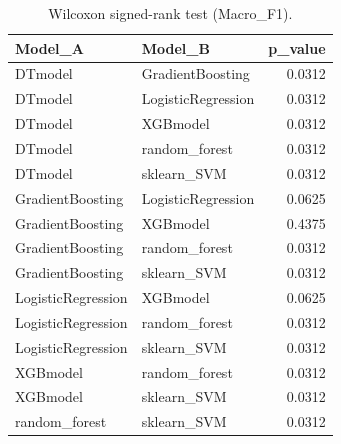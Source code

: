 \begin{table}[t]
\centering
\begin{tabular}{llr}
\toprule
Model_A & Model_B & p_value \\
\midrule
DTmodel & GradientBoosting & 0.0312 \\
DTmodel & LogisticRegression & 0.0312 \\
DTmodel & XGBmodel & 0.0312 \\
DTmodel & random_forest & 0.0312 \\
DTmodel & sklearn_SVM & 0.0312 \\
GradientBoosting & LogisticRegression & 0.0625 \\
GradientBoosting & XGBmodel & 0.4375 \\
GradientBoosting & random_forest & 0.0312 \\
GradientBoosting & sklearn_SVM & 0.0312 \\
LogisticRegression & XGBmodel & 0.0625 \\
LogisticRegression & random_forest & 0.0312 \\
LogisticRegression & sklearn_SVM & 0.0312 \\
XGBmodel & random_forest & 0.0312 \\
XGBmodel & sklearn_SVM & 0.0312 \\
random_forest & sklearn_SVM & 0.0312 \\
\bottomrule
\end{tabular}
\caption{Wilcoxon signed-rank test (Macro_F1).}
\label{tab:wilcoxon_Macro_F1}
\end{table}